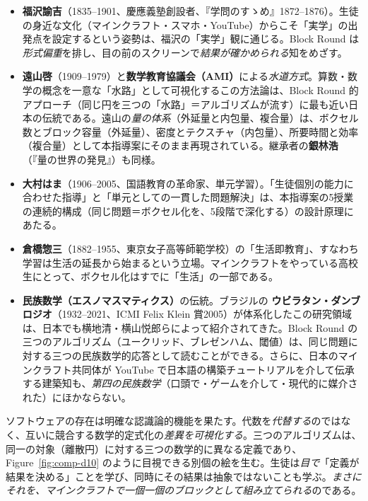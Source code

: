\documentclass[12pt,a4paper]{scrartcl}
\newcommand{\acc}[1]{\textcolor{accent}{\textbf{#1}}}
\begin{document}
\begin{itemize}[leftmargin=1.3em,itemsep=0.2em,topsep=0.3em]
  \item \acc{福沢諭吉}（1835--1901、慶應義塾創設者、『学問のすゝめ』1872--1876）。生徒の身近な文化（マインクラフト・スマホ・YouTube）からこそ「実学」の出発点を設定するという姿勢は、福沢の「実学」観に通じる。Block Round は\emph{形式偏重}を排し、目の前のスクリーンで\emph{結果が確かめられる}知をめざす。

  \item \acc{遠山啓}（1909--1979）と\acc{数学教育協議会（AMI）}による\emph{水道方式}。算数・数学の概念を一意な「水路」として可視化するこの方法論は、Block Round 的アプローチ（同じ円を三つの「水路」＝アルゴリズムが流す）に最も近い日本の伝統である。遠山の\emph{量の体系}（外延量と内包量、複合量）は、ボクセル数とブロック容量（外延量）、密度とテクスチャ（内包量）、所要時間と効率（複合量）として本指導案にそのまま再現されている。継承者の\acc{銀林浩}（『量の世界の発見』）も同様。

  \item \acc{大村はま}（1906--2005、国語教育の革命家、単元学習）。「生徒個別の能力に合わせた指導」と「単元としての一貫した問題解決」は、本指導案の5授業の連続的構成（同じ問題＝ボクセル化を、5段階で深化する）の設計原理にあたる。

  \item \acc{倉橋惣三}（1882--1955、東京女子高等師範学校）の「生活即教育」、すなわち学習は生活の延長から始まるという立場。マインクラフトをやっている高校生にとって、ボクセル化はすでに「生活」の一部である。

  \item \acc{民族数学（エスノマスマティクス）}の伝統。ブラジルの \acc{ウビラタン・ダンブロジオ}（1932--2021、ICMI Felix Klein 賞2005）が体系化したこの研究領域は、日本でも横地清・横山悦郎らによって紹介されてきた。Block Round の三つのアルゴリズム（ユークリッド、ブレゼンハム、閾値）は、同じ問題に対する三つの民族数学的応答として読むことができる。さらに、日本のマインクラフト共同体が YouTube で日本語の構築チュートリアルを介して伝承する建築知も、\emph{第四の民族数学}（口頭で・ゲームを介して・現代的に媒介された）にほかならない。

\end{itemize}

ソフトウェアの存在は明確な認識論的機能を果たす。代数を\emph{代替する}のではなく、互いに競合する数学的定式化の\emph{差異を可視化する}。三つのアルゴリズムは、同一の対象（離散円）に対する三つの数学的に異なる定義であり、Figure~\ref{fig:comp-d10} のように目視できる別個の絵を生む。生徒は\emph{目で}「定義が結果を決める」ことを学び、同時にその結果は抽象ではないことも学ぶ。\emph{まさにそれを、マインクラフトで一個一個のブロックとして組み立てられる}のである。
\end{document}
